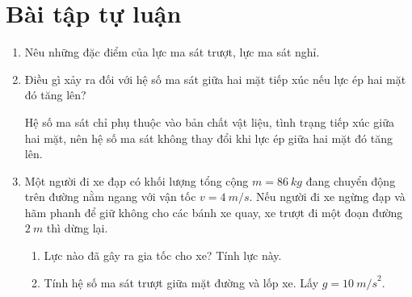 \section{Bài tập tự luận}
\begin{enumerate}[label=\bfseries Bài \arabic*:,leftmargin=1.5cm]
		\item {}
	
	{
		Nêu những đặc điểm của lực ma sát trượt, lực ma sát nghỉ.
	}
	

	
	\item {}
	
	
	{Điều gì xảy ra đối với hệ số ma sát giữa hai mặt tiếp xúc nếu lực ép hai mặt đó tăng lên?
	}
	
	\hideall
	{Hệ số ma sát chỉ phụ thuộc vào bản chất vật liệu, tình trạng tiếp xúc giữa hai mặt, nên hệ số ma sát không thay đổi khi lực ép giữa hai mặt đó tăng lên.
	}
	\item {}
	
	{
		Một người đi xe đạp có khối lượng tổng cộng $m = \SI{86}{kg}$ đang chuyển động trên đường nằm ngang với vận tốc $v = \SI{4}{m/s}$. Nếu người đi xe ngừng đạp và hãm phanh để giữ không cho các bánh xe quay, xe trượt đi một đoạn đường $\SI{2}{m}$ thì dừng lại.
		\begin{enumerate}[label=\alph*)]
			\item Lực nào đã gây ra gia tốc cho xe? Tính lực này.
			\item Tính hệ số ma sát trượt giữa mặt đường và lốp xe. Lấy $g = \SI{10}{m/s}^2$.
		\end{enumerate}
	}
	

\end{enumerate}
